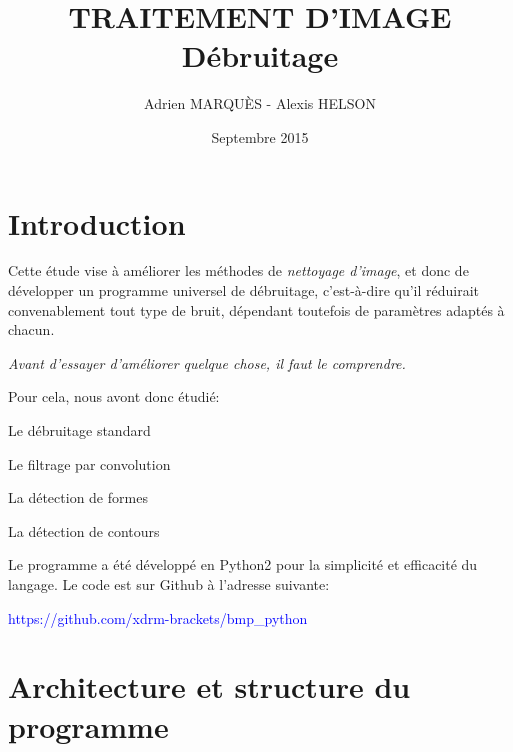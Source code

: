 \documentclass{article}
\title{TRAITEMENT D'IMAGE\\Débruitage}
\author{Adrien MARQUÈS - Alexis HELSON }
\date{Septembre 2015}
\begin{document}
	\maketitle

	\section{Introduction}
		Cette étude vise à améliorer les méthodes de \emph{nettoyage d'image}, et donc de développer un programme universel de débruitage, c'est-à-dire qu'il réduirait convenablement tout type de bruit, dépendant toutefois de paramètres adaptés à chacun.
		\begin{center} \emph{Avant d'essayer d'améliorer quelque chose, il faut le comprendre.} \end{center}
		
		Pour cela, nous avont donc étudié:
		\begin{description}
			\item Le débruitage standard
			\item Le filtrage par convolution
			\item La détection de formes
			\item La détection de contours
		\end{description}
		Le programme a été développé en Python2 pour la simplicité et efficacité du langage. Le code est sur Github à l'adresse suivante:
		\begin{center} \textcolor{blue}{https://github.com/xdrm-brackets/bmp\_python} \end{center}




	\section{Architecture et structure du programme}
		
\end{document}

